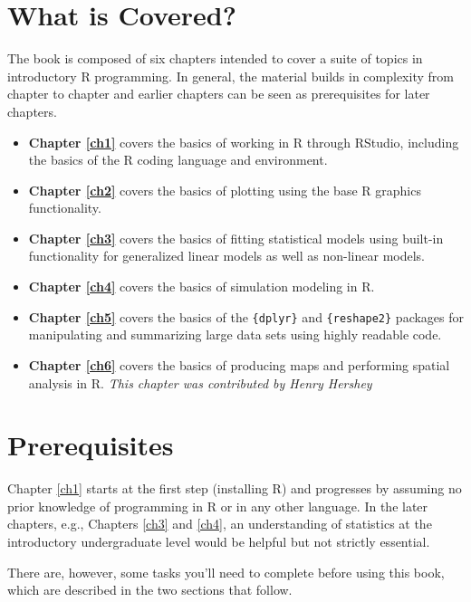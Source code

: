 \documentclass[]{book}
\providecommand{\tightlist}{%
  \setlength{\itemsep}{0pt}\setlength{\parskip}{0pt}}
\theoremstyle{definition}
\theoremstyle{definition}
\theoremstyle{definition}
\theoremstyle{remark}
\begin{document}
\section*{What is Covered?}\label{what-is-covered}

The book is composed of six chapters intended to cover a suite of topics
in introductory R programming. In general, the material builds in
complexity from chapter to chapter and earlier chapters can be seen as
prerequisites for later chapters.

\begin{itemize}
\tightlist
\item
  \textbf{Chapter \ref{ch1}} covers the basics of working in R through
  RStudio, including the basics of the R coding language and
  environment.
\item
  \textbf{Chapter \ref{ch2}} covers the basics of plotting using the
  base R graphics functionality.
\item
  \textbf{Chapter \ref{ch3}} covers the basics of fitting statistical
  models using built-in functionality for generalized linear models as
  well as non-linear models.\\
\item
  \textbf{Chapter \ref{ch4}} covers the basics of simulation modeling in
  R.
\item
  \textbf{Chapter \ref{ch5}} covers the basics of the \texttt{\{dplyr\}}
  and \texttt{\{reshape2\}} packages for manipulating and summarizing
  large data sets using highly readable code.
\item
  \textbf{Chapter \ref{ch6}} covers the basics of producing maps and
  performing spatial analysis in R. \emph{This chapter was contributed
  by Henry Hershey}
\end{itemize}

\section*{Prerequisites}\label{prerequisites}

Chapter \ref{ch1} starts at the first step (installing R) and progresses
by assuming no prior knowledge of programming in R or in any other
language. In the later chapters, e.g., Chapters \ref{ch3} and \ref{ch4},
an understanding of statistics at the introductory undergraduate level
would be helpful but not strictly essential.

There are, however, some tasks you'll need to complete before using this
book, which are described in the two sections that follow.
\end{document}
